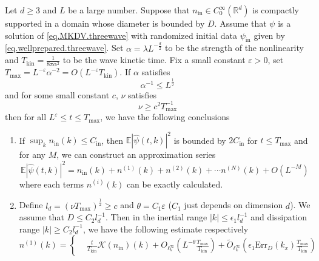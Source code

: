\begin{thm}\label{th.main}
Let $d\ge 3$ and $L$ be a large number. Suppose that $n_{\mathrm{in}} \in C^\infty_0(\mathbb{R}^d)$ is compactly supported in a domain whose diameter is bounded by $D$. Assume that $\psi$ is a solution of \eqref{eq.MKDV.threewave} with randomized initial data $\psi_{\mathrm{in}}$ given by \eqref{eq.wellprepared.threewave}. Set $\alpha=\lambda L^{-\frac{d}{2}}$ to be the strength of the nonlinearity and $T_{\mathrm{kin}}=\frac{1}{8\pi\alpha^2}$ to be the wave kinetic time. Fix a small constant $\varepsilon> 0$, set $T_{\text{max}} = L^{-\varepsilon} \alpha^{-2}=O(L^{-\varepsilon}T_{\mathrm{kin}})$. If $\alpha$ satisfies
\begin{equation}\label{eq.conditionalpha.threewave}
\alpha^{-1}\le L^{\frac{1}{2}}
\end{equation}
and for some small constant $c$, $\nu$ satisfies
\begin{equation}\label{eq.conditionnu.threewave}
\nu\ge c^2T^{-1}_{\text{max}}
\end{equation}
then for all $L^{\varepsilon} \leq t \leq T_{\text{max}}$, we have the following conclusions
\begin{enumerate}
    \item If $\sup_{k}n_{\mathrm{in}}(k)\le C_{\mathrm{in}}$, then $\mathbb E |\widehat \psi(t, k)|^2$ is bounded by $2C_{\mathrm{in}}$ for $t\le T_{\text{max}}$ and for any $M$, we can construct an approximation series 
    \begin{equation}\label{eq.approx1.threewave}
        \mathbb E |\widehat \psi(t, k)|^2=n_{\mathrm{in}}(k)+n^{(1)}(k)+n^{(2)}(k)+\cdots n^{(N)}(k)+O(L^{-M})
    \end{equation}
    where each terms $n^{(i)}(k)$ can be exactly calculated.
    \item Define $l_{d}=(\nu T_{\mathrm{max}})^{\frac{1}{2}}\ge c$ and  $\theta=C_1\varepsilon$ ($C_1$ just depends on dimension $d$). We assume that $D\le C_2 l_d^{-1}$. Then in the inertial range $|k|\le \epsilon_1 l_{d}^{-1}$ and dissipation range $|k|\ge C_{2}l_d^{-1}$, we have the following estimate respectively
    \begin{equation}\label{eq.n1.threewave}
        n^{(1)}(k)=\left\{
        \begin{aligned}
            &\frac{t}{T_{\mathrm{kin}}}\mathcal K(n_{\mathrm{in}})(k)+O_{\ell^\infty_k}\left(L^{-\theta}\frac{T_{\text{max}}}{T_{\mathrm {kin}}}\right)+\widetilde{O}_{\ell^\infty_k}\left(\epsilon_1\text{Err}_{D}(k_x)\frac{T_{\text{max}}}{T_{\mathrm {kin}}}\right)

\end{aligned}
\end{equation}
\end{enumerate}
\end{thm}
